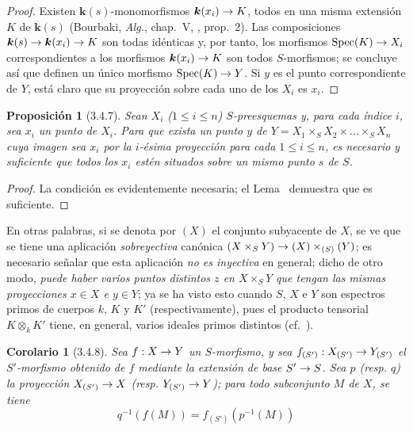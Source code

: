 \documentclass[oneside]{amsart}
\theoremstyle{ega-env-style}
\theoremstyle{ega-thm-env-style}
\newtheorem*{proposition}{Proposición}
\newtheorem*{corollary}{Corolario}
\theoremstyle{ega-defn-env-style}
\def\leq{\leqslant}                 %
\renewcommand{\to}{\mathchoice{\longrightarrow}{\rightarrow}{\rightarrow}{\rightarrow}}
\let\EGAOriginalLabel\label
\renewcommand{\label}[1]{\phantomsection\EGAOriginalLabel{#1}}
\begin{document}
\begin{proof}
Existen $\boldsymbol{k}(s)$-monomorfismos $\boldsymbol{k}(x_i)\to K$, todos en una misma extensión $K$ de $\boldsymbol{k}(s)$ (Bourbaki, \emph{Alg.}, chap.~V, , prop.~2).
Las composiciones $\boldsymbol{k}(s)\to \boldsymbol{k}(x_i)\to K$ son todas idénticas y, por tanto, los morfismos $\operatorname{Spec}(K)\to X_i$ correspondientes a los morfismos $\boldsymbol{k}(x_i)\to K$ son todos $S$-morfismos; se concluye así que definen un único morfismo $\operatorname{Spec}(K)\to Y$.
Si $y$ es el punto correspondiente de $Y$, está claro que su proyección sobre cada uno de los $X_i$ es $x_i$.
\end{proof}

\begin{proposition}[3.4.7]
\label{I.3.4.7}
Sean $X_i$ ($1\leq i\leq n$) $S$-preesquemas y, para cada índice $i$, sea $x_i$ un punto de $X_i$.
Para que exista un punto $y$ de $Y=X_1\times_S X_2\times\ldots\times_S X_n$ cuya imagen sea $x_i$ por la $i$-ésima proyección para cada $1\leq i\leq n$, es necesario y suficiente que todos los $x_i$ estén situados sobre un mismo punto $s$ de $S$.
\end{proposition}

\begin{proof}
La condición es evidentemente necesaria; el Lema~ demuestra que es suficiente.
\end{proof}

En otras palabras, si se denota por \label{I.3.4.7.underlying-map-fr}
$(X)$ el conjunto subyacente de $X$, se ve que se tiene una aplicación \emph{sobreyectiva} canónica $(X\times_S Y)\to (X)\times_{(S)}(Y)$; es necesario señalar que esta aplicación \emph{no es inyectiva} en general; dicho de otro modo, \emph{puede haber varios puntos distintos $z$ en $X\times_S Y$ que tengan las mismas proyecciones $x\in X$ e $y\in Y$}; ya se ha visto esto cuando $S$, $X$ e $Y$ son espectros primos de cuerpos $k$, $K$ y $K'$ (respectivamente), pues el producto tensorial $K\otimes_k K'$ tiene, en general, varios ideales primos distintos (cf.~).

\begin{corollary}[3.4.8]
\label{I.3.4.8}
Sea $f:X\to Y$ un $S$-morfismo, y sea $f_{(S')}:X_{(S')}\to Y_{(S')}$ el $S'$-morfismo obtenido de $f$ mediante la extensión de base $S'\to S$.
Sea $p$ (\textup{resp.} $q$) la proyección $X_{(S')}\to X$ (\textup{resp.} $Y_{(S')}\to Y$); para todo subconjunto $M$ de $X$, se tiene
\label{I.3.4.8.base-change-image-fr}
\[
  q^{-1}(f(M))=f_{(S')}(p^{-1}(M))
\]
\end{corollary}
\end{document}
